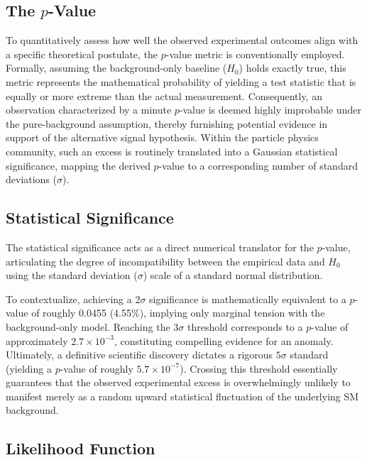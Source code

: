 \subsection{The $p$-Value}
\label{subsec:p-value}

To quantitatively assess how well the observed experimental outcomes align with a specific theoretical postulate, the $p$-value metric is conventionally employed. Formally, assuming the background-only baseline ($H_0$) holds exactly true, this metric represents the mathematical probability of yielding a test statistic that is equally or more extreme than the actual measurement. Consequently, an observation characterized by a minute $p$-value is deemed highly improbable under the pure-background assumption, thereby furnishing potential evidence in support of the alternative signal hypothesis. Within the particle physics community, such an excess is routinely translated into a Gaussian statistical significance, mapping the derived $p$-value to a corresponding number of standard deviations ($\sigma$).

\subsection{Statistical Significance}
\label{subsec:significance}

The statistical significance acts as a direct numerical translator for the $p$-value, articulating the degree of incompatibility between the empirical data and $H_0$ using the standard deviation ($\sigma$) scale of a standard normal distribution.

To contextualize, achieving a $2\sigma$ significance is mathematically equivalent to a $p$-value of roughly 0.0455 (4.55\%), implying only marginal tension with the background-only model. Reaching the $3\sigma$ threshold corresponds to a $p$-value of approximately $2.7 \times 10^{-3}$, constituting compelling evidence for an anomaly. Ultimately, a definitive scientific discovery dictates a rigorous $5\sigma$ standard (yielding a $p$-value of roughly $5.7 \times 10^{-7}$). Crossing this threshold essentially guarantees that the observed experimental excess is overwhelmingly unlikely to manifest merely as a random upward statistical fluctuation of the underlying SM background.

\subsection{Likelihood Function}
\label{subsec:likelihood}

